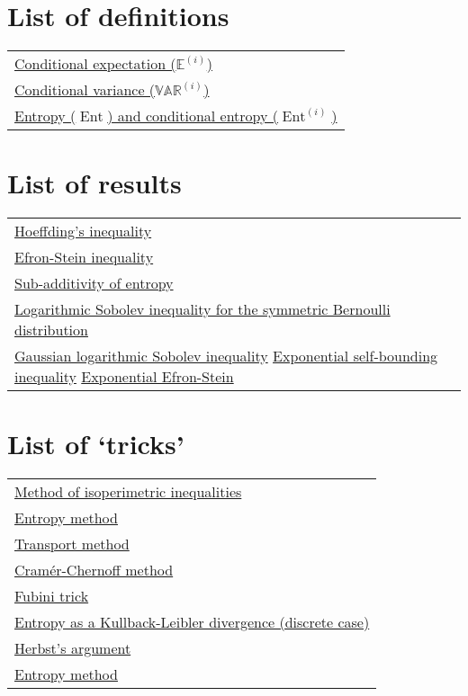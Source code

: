 \documentclass{amsproc}
\newcommand{\E}{\mathbb{E}} %
\newcommand{\var}{\mathbb{VAR}} %
\DeclareMathOperator{\Ent}{Ent} %
\begin{document}
\appendix
\newpage


\section*{List of definitions}
	\begin{tabular}{l}
		\hyperref[thm:ESI]{Conditional expectation ($\E^{(i)}$)}\\
		\hyperref[thm:ESI]{Conditional variance ($\var^{(i)}$)}\\
		\hyperref[thm:sub_add_entropy]{Entropy ($\Ent$) and conditional entropy ($\Ent^{(i)}$)}
	\end{tabular}
\section*{List of results}
	\begin{tabular}{l}
		\hyperref[thm:hoeffding]{Hoeffding's inequality}\\
		\hyperref[thm:ESI]{Efron-Stein inequality}\\
		\hyperref[thm:sub_add_entropy]{Sub-additivity of entropy}\\
		\hyperref[thm:log_Sob_ineq_sym_Bernoulli]{Logarithmic Sobolev inequality for the symmetric Bernoulli distribution}\\
		\hyperref[thm:Gaussian_log_Sob_ineq]{Gaussian logarithmic Sobolev inequality}
		\hyperref[thm:expSelfBounding]{Exponential self-bounding inequality}
		\hyperref[thm:expEfronStein]{Exponential Efron-Stein}
	\end{tabular}
\section*{List of `tricks'}
	\begin{tabular}{l}
		\hyperref[sec:method_of_isoperimetric_inequalities]{Method of isoperimetric inequalities}\\
		\hyperref[sec:entropy_method]{Entropy method}\\
		\hyperref[sec:transport_method]{Transport method}\\
		\hyperref[rmk:cramer_chernoff]{Cram\'{e}r-Chernoff method}\\
		\hyperref[rmk:Fubini]{Fubini trick}\\
		\hyperref[rmk:entropy_as_KL_divergence]{Entropy as a Kullback-Leibler divergence (discrete case)}\\
		\hyperref[rmk:herbst]{Herbst's argument} \\
		\hyperref[rmk:EntMet]{Entropy method}
	\end{tabular}
\end{document}
